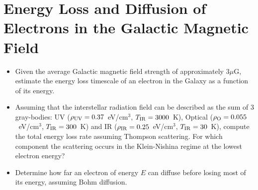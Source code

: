 \section{Energy Loss and Diffusion of Electrons in the Galactic Magnetic Field}

\begin{itemize}
\item Given the average Galactic magnetic field strength of approximately \( 3 \mu\)G, estimate the energy loss timescale of an electron in the Galaxy as a function of its energy.
\item Assuming that the interstellar radiation field can be described as the sum of 3 gray-bodies: UV ($\rho_{\rm UV} = 0.37$~eV/cm$^3$, $T_{\rm IR} = 3000$~K), Optical ($\rho_{\rm O} = 0.055$~eV/cm$^3$, $T_{\rm IR} = 300$~K) and IR ($\rho_{\rm IR} = 0.25$~eV/cm$^3$, $T_{\rm IR} = 30$~K), compute the total energy loss rate assuming Thompson scattering. For which component the scattering occurs in the Klein-Nishina regime at the lowest electron energy?
\item Determine how far an electron of energy $E$ can diffuse before losing most of its energy, assuming Bohm diffusion.
\end{itemize}
